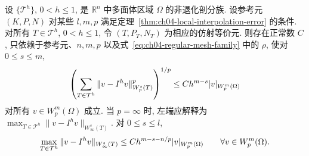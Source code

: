\setcounter{thmcount}{19}
\begin{Theorem}
\label{thm:ch04-global-interpolation-error}
设 $\{\mathcal T^h\}$, $0<h\leq1$, 是 $\mathbb R^n$ 中多面体区域 $\Omega$ 的非退化剖分族. 设参考元 $(K,P,N)$ 对某些 $l,m,p$ 满足定理~\ref{thm:ch04-local-interpolation-error} 的条件. 对所有 $T\in\mathcal T^h$, $0<h\leq1$, 令 $(T,P_T,N_T)$ 为相应的仿射等价元. 则存在正常数 $C$, 只依赖于参考元、$n,m,p$ 以及式~\eqref{eq:ch04-regular-mesh-family} 中的 $\rho$, 使对 $0\leq s\leq m$,
\begin{equation}
\MathBookFormulaID{formula-ch04-global-interpolation-lp-error}
\label{eq:ch04-global-interpolation-lp-error}
\left(\sum_{T\in\mathcal T^h}\|v-I^h v\|_{W_p^s(T)}^p\right)^{1/p}
\leq Ch^{m-s}|v|_{W_p^m(\Omega)}
\end{equation}
对所有 $v\in W_p^m(\Omega)$ 成立. 当 $p=\infty$ 时, 左端应解释为 $\max_{T\in\mathcal T^h}\|v-I^h v\|_{W_\infty^s(T)}$. 对 $0\leq s\leq l$,
\begin{equation}
\MathBookFormulaID{formula-ch04-global-interpolation-linfty-error}
\label{eq:ch04-global-interpolation-linfty-error}
\max_{T\in\mathcal T^h}\|v-I^h v\|_{W_\infty^s(T)}
\leq Ch^{m-s-n/p}|v|_{W_p^m(\Omega)}
\qquad\forall v\in W_p^m(\Omega).
\end{equation}
\end{Theorem}
